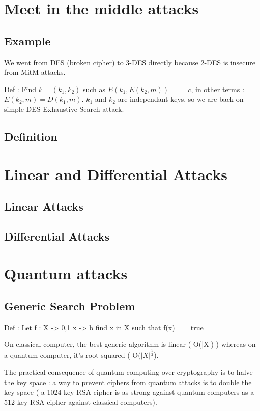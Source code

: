 \section{Meet in the middle attacks}

\subsection{Example}
We went from DES (broken cipher) to 3-DES directly because 2-DES is insecure from MitM attacks.

Def : Find $k = (k_1,k_2)$ such as $E(k_1,E(k_2,m)) == c$, in other terms : $E(k_2,m) = D(k_1,m) $.
$k_1$ and $k_2$ are independant keys, so we are back on simple DES Exhaustive Search attack.

\subsection{Definition}

\section{Linear and Differential Attacks}
\subsection{Linear Attacks}
\subsection{Differential Attacks}


\section{Quantum attacks}

\subsection{ Generic Search Problem}

Def : Let f : X -> {0,1}
              x ->   b
find x in X such that f(x) == true

On classical computer, the best generic algorithm is linear ( O(|X|) ) whereas on a quantum computer, it's root-squared ( O($|X|^{\frac{1}{2}}$).

The practical consequence of quantum computing over cryptography is to halve the key space : a way to prevent ciphers from quantum attacks is to double the key space ( a 1024-key RSA cipher is as strong against quantum computers as a 512-key RSA cipher against classical computers).



